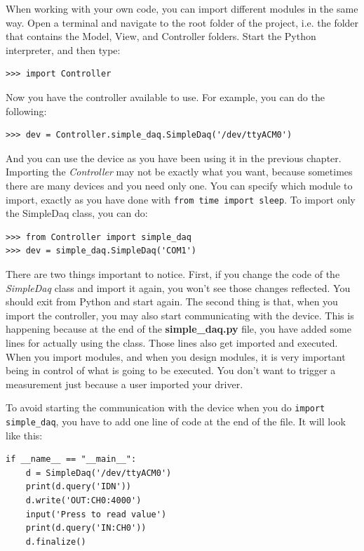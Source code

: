 When working with your own code, you can import different modules in the same way. Open a terminal and navigate to the root folder of the project, i.e. the folder that contains the Model, View, and Controller folders. Start the Python interpreter, and then type:

\begin{verbatim}
>>> import Controller
\end{verbatim}

Now you have the controller available to use. For example, you can do the following:

\begin{verbatim}
>>> dev = Controller.simple_daq.SimpleDaq('/dev/ttyACM0')
\end{verbatim}

And you can use the device as you have been using it in the previous chapter. Importing the \emph{Controller} may not be exactly what you
want, because sometimes there are many devices and you need only one. You can specify which module to import, exactly as you have done with
\texttt{from time import sleep}. To import only the SimpleDaq class, you can do:

\begin{verbatim}
>>> from Controller import simple_daq
>>> dev = simple_daq.SimpleDaq('COM1')
\end{verbatim}

There are two things important to notice. First, if you change the code of the \emph{SimpleDaq} class and import it again, you won't see those
changes reflected. You should exit from Python and start again. The second thing is that, when you import the controller, you may also start
communicating with the device. This is happening because at the end of the \textbf{simple\_daq.py} file, you have added some lines for actually using
the class. Those lines also get imported and executed. When you import modules, and when you design modules, it is very important being in control of what is going to be executed. You don't want to trigger a measurement just because a user imported your driver. 

To avoid starting the communication with the device when you do \texttt{import simple_daq}, you have to add one line of code at
the end of the file. It will look like this:

\begin{verbatim}
if __name__ == "__main__":
    d = SimpleDaq('/dev/ttyACM0')
    print(d.query('IDN'))
    d.write('OUT:CH0:4000')
    input('Press to read value')
    print(d.query('IN:CH0'))
    d.finalize()
\end{verbatim}

